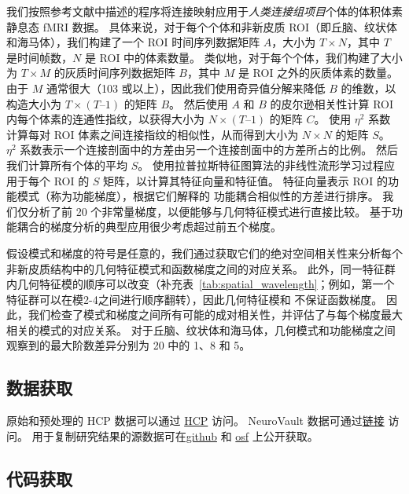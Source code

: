 \documentclass[lang=cn,a4paper,newtx,citestyle=gb7714-2015, bibstyle=gb7714-2015]{elegantpaper}
\begin{document}
我们按照参考文献中描述的程序将连接映射应用于\textit{人类连接组项目}个体的体积体素静息态 fMRI 数据\cite{haak2018connectopic}。
具体来说，对于每个个体和非新皮质 ROI（即丘脑、纹状体和海马体），我们构建了一个 ROI 时间序列数据矩阵 $ A $，大小为 $ T \times N $，其中 $ T $ 是时间帧数，$ N $ 是 ROI 中的体素数量。
类似地，对于每个个体，我们构建了大小为 $ T \times M $ 的灰质时间序列数据矩阵 $ B $，其中 $ M $ 是 ROI 之外的灰质体素的数量。
由于 $ M $ 通常很大（103 或以上），因此我们使用奇异值分解来降低 $ B $ 的维数，以构造大小为 $ T \times (T – 1) $ 的矩阵 $ B $。
然后使用 $ A $ 和 $ B $ 的皮尔逊相关性计算 ROI 内每个体素的连通性指纹，以获得大小为 $ N \times (T – 1) $ 的矩阵 $ C $。
使用 $ \eta^2 $ 系数 \cite{alexander2018testing} 计算每对 ROI 体素之间连接指纹的相似性，从而得到大小为 $ N \times N $ 的矩阵 $ S $。
$ \eta^2 $ 系数表示一个连接剖面中的方差由另一个连接剖面中的方差所占的比例。
然后我们计算所有个体的平均 $ S $。 
使用拉普拉斯特征图算法\cite{belkin2003laplacian}的非线性流形学习过程应用于每个 ROI 的 $ S $ 矩阵，以计算其特征向量和特征值。
特征向量表示 ROI 的功能模式（称为功能梯度），根据它们解释的 功能耦合相似性的方差进行排序。
我们仅分析了前 20 个非常量梯度，以便能够与几何特征模式进行直接比较。
基于功能耦合的梯度分析的典型应用很少考虑超过前五个梯度\cite{haak2018connectopic,margulies2016situating}。


假设模式和梯度的符号是任意的，我们通过获取它们的绝对空间相关性来分析每个非新皮质结构中的几何特征模式和函数梯度之间的对应关系。
此外，同一特征群内几何特征模的顺序可以改变（补充表~\ref{tab:spatial_wavelength}；例如，第一个特征群可以在模2-4之间进行顺序翻转），因此几何特征模和 不保证函数梯度。
因此，我们检查了模式和梯度之间所有可能的成对相关性，并评估了与每个梯度最大相关的模式的对应关系。
对于丘脑、纹状体和海马体，几何模式和功能梯度之间观察到的最大阶数差异分别为 20 中的 1、8 和 5。


\subsection{数据获取} \label{sec:data_availability}

原始和预处理的 HCP 数据可以通过 \href{https://db. human connectome.org/}{HCP} 访问。
NeuroVault 数据可通过\href{https://neurovault.org/}{链接} 访问。
用于复制研究结果的源数据可在\href{https://github.com/NSBLab/BrainEigenmodes}{github}  和 \href{https://osf.io/xczmp/}{osf} 上公开获取。

\subsection{代码获取} \label{sec:code_availability}
\end{document}
